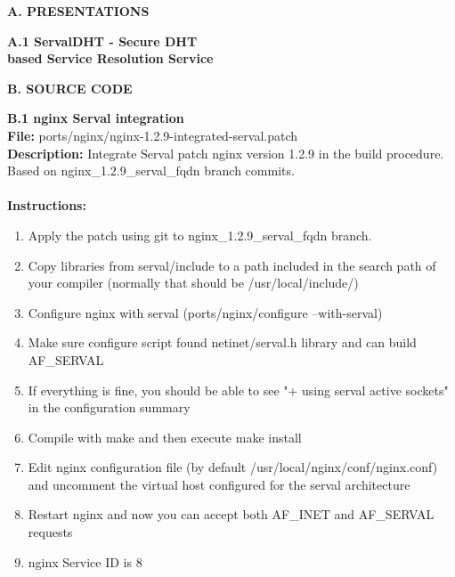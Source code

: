 \newpage
{}
{}
{\Huge \bf \noindent A. PRESENTATIONS}

\newpage
{}
{}
\label{sec:servaldhtpres}
{\huge \bf \noindent A.1 ServalDHT - Secure DHT\\[0.2cm] based Service Resolution Service}



\newpage
{}
{}
\label{sec:sourcecode}
{\Huge \bf \noindent B. SOURCE CODE}


\newpage
{}
{}
\label{sec:nginxport}
{\huge \bf \noindent B.1 nginx Serval integration}\\[0.5cm]
\textbf{File:} ports/nginx/nginx-1.2.9-integrated-serval.patch\\
\textbf{Description:} Integrate Serval patch nginx version 1.2.9 in the build procedure. Based on nginx\_1.2.9\_serval\_fqdn branch commits.\\\\
\textbf{Instructions: }
\begin{enumerate} \itemsep1pt \parskip0pt 
	\item Apply the patch using git to nginx\_1.2.9\_serval\_fqdn branch.
	\item Copy libraries from serval/include to a path included in the search path of your compiler (normally that should be /usr/local/include/)
	\item Configure nginx with serval (ports/nginx/configure --with-serval)
	\item Make sure configure script found netinet/serval.h library and can build AF\_SERVAL
	\item If everything is fine, you should be able to see "+ using serval active sockets" in the configuration summary
	\item Compile with make and then execute make install
	\item Edit nginx configuration file (by default /usr/local/nginx/conf/nginx.conf) and uncomment the virtual host configured for the serval architecture
	\item Restart nginx and now you can accept both AF\_INET and AF\_SERVAL requests
	\item nginx Service ID is 8\\[0.5cm]
\end{enumerate}


